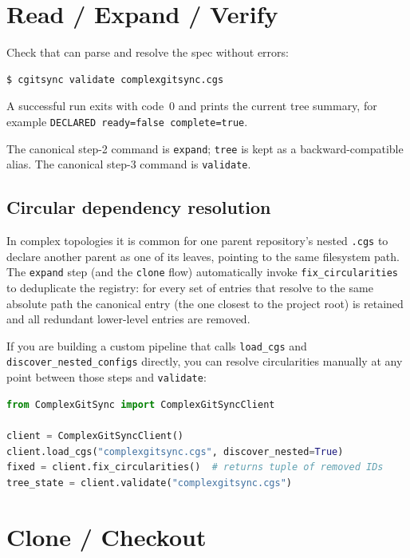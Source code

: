 \section{Read / Expand / Verify}

Check that \cgscli{} can parse and resolve the spec without errors:

\begin{lstlisting}[language=bash]
$ cgitsync validate complexgitsync.cgs
\end{lstlisting}

A successful run exits with code~0 and prints the current tree summary, for
example \texttt{DECLARED ready=false complete=true}.

The canonical step-2 command is \texttt{expand}; \texttt{tree} is kept as a
backward-compatible alias.  The canonical step-3 command is \texttt{validate}.

\subsection*{Circular dependency resolution}

In complex topologies it is common for one parent repository's nested
\texttt{.cgs} to declare another parent as one of its leaves, pointing to
the same filesystem path.  The \texttt{expand} step (and the
\texttt{clone} flow) automatically invoke \texttt{fix\_circularities} to
deduplicate the registry: for every set of entries that resolve to the same
absolute path the canonical entry (the one closest to the project root) is
retained and all redundant lower-level entries are removed.

If you are building a custom pipeline that calls \texttt{load\_cgs} and
\texttt{discover\_nested\_configs} directly, you can resolve circularities
manually at any point between those steps and \texttt{validate}:

\begin{lstlisting}[language=Python]
from ComplexGitSync import ComplexGitSyncClient

client = ComplexGitSyncClient()
client.load_cgs("complexgitsync.cgs", discover_nested=True)
fixed = client.fix_circularities()  # returns tuple of removed IDs
tree_state = client.validate("complexgitsync.cgs")
\end{lstlisting}

\section{Clone / Checkout}


